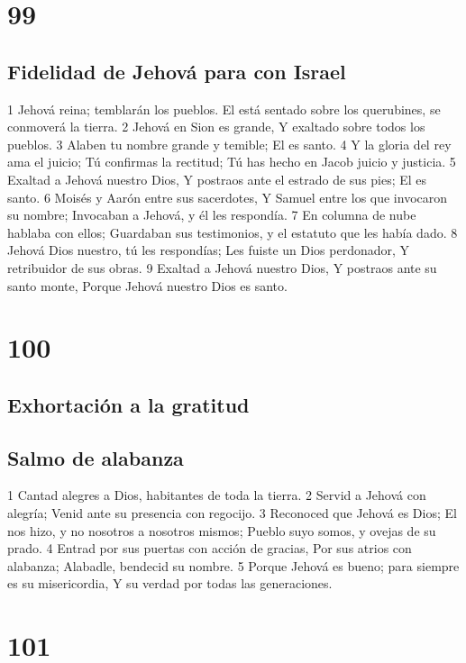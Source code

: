 \chapter{99}

\section*{Fidelidad de Jehová para con Israel}

1 Jehová reina; temblarán los pueblos.
El está sentado sobre los querubines, se conmoverá la tierra.
2 Jehová en Sion es grande,
Y exaltado sobre todos los pueblos.
3 Alaben tu nombre grande y temible;
El es santo.
4 Y la gloria del rey ama el juicio;
Tú confirmas la rectitud;
Tú has hecho en Jacob juicio y justicia.
5 Exaltad a Jehová nuestro Dios,
Y postraos ante el estrado de sus pies;
El es santo.
6 Moisés y Aarón entre sus sacerdotes,
Y Samuel entre los que invocaron su nombre;
Invocaban a Jehová, y él les respondía.
7 En columna de nube hablaba con ellos;
Guardaban sus testimonios, y el estatuto que les había dado.
8 Jehová Dios nuestro, tú les respondías;
Les fuiste un Dios perdonador,
Y retribuidor de sus obras.
9 Exaltad a Jehová nuestro Dios,
Y postraos ante su santo monte,
Porque Jehová nuestro Dios es santo.

\chapter{100}

\section*{Exhortación a la gratitud}

\section*{Salmo de alabanza}

1 Cantad alegres a Dios, habitantes de toda la tierra.
2 Servid a Jehová con alegría;
Venid ante su presencia con regocijo.
3 Reconoced que Jehová es Dios;
El nos hizo, y no nosotros a nosotros mismos;
Pueblo suyo somos, y ovejas de su prado.
4 Entrad por sus puertas con acción de gracias,
Por sus atrios con alabanza;
Alabadle, bendecid su nombre.
5 Porque Jehová es bueno; para siempre es su misericordia,
Y su verdad por todas las generaciones.

\chapter{101}

